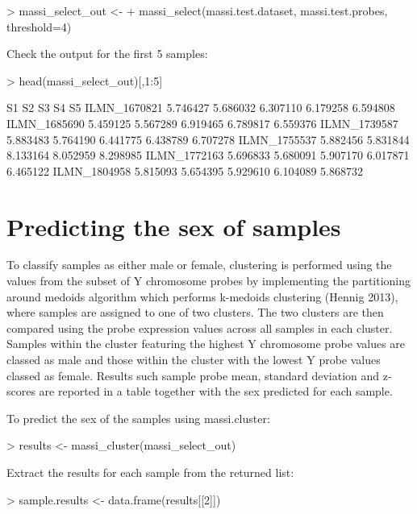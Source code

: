 \documentclass{article}
\begin{document}
\begin{Schunk}
\begin{Sinput}
> massi_select_out <- 
+   massi_select(massi.test.dataset, massi.test.probes, threshold=4)
\end{Sinput}
\end{Schunk}
Check the output for the first 5 samples:
\begin{Schunk}
\begin{Sinput}
> head(massi_select_out)[,1:5]
\end{Sinput}
\begin{Soutput}
                   S1       S2       S3       S4       S5
ILMN_1670821 5.746427 5.686032 6.307110 6.179258 6.594808
ILMN_1685690 5.459125 5.567289 6.919465 6.789817 6.559376
ILMN_1739587 5.883483 5.764190 6.441775 6.438789 6.707278
ILMN_1755537 5.882456 5.831844 8.133164 8.052959 8.298985
ILMN_1772163 5.696833 5.680091 5.907170 6.017871 6.465122
ILMN_1804958 5.815093 5.654395 5.929610 6.104089 5.868732
\end{Soutput}
\end{Schunk}

\section{Predicting the sex of samples}

To classify samples as either male or female, clustering is performed using the values from the subset of Y chromosome probes  by implementing the partitioning around medoids algorithm which performs k-medoids clustering (Hennig 2013), where samples are assigned to one of two clusters. The two clusters are then compared using the probe expression values across all samples in each cluster. Samples within the cluster featuring the highest Y chromosome probe values are classed as male and those within the cluster with the lowest Y probe values classed as female. Results such sample probe mean, standard deviation and z-scores are reported in a table together with the sex predicted for each sample.

To predict the sex of the samples using massi.cluster:
\begin{Schunk}
\begin{Sinput}
> results <- massi_cluster(massi_select_out)
\end{Sinput}
\end{Schunk}

Extract the results for each sample from the returned list:
\begin{Schunk}
\begin{Sinput}
> sample.results <- data.frame(results[[2]])
\end{Sinput}
\end{Schunk}
\end{document}
